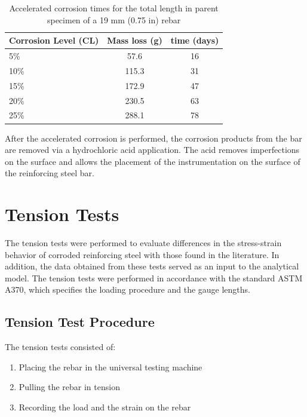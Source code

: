 \begin{table}[htbp]
	\caption{Accelerated corrosion times for the total length in parent specimen of a 19 mm (0.75 in) rebar}
	\label{tab:AcceleratedCorrosionTime}
	\centering	
		\begin{tabular}{l c c}
		Corrosion Level (CL) & Mass loss (g)   & time (days)     \\  \hline	
		5\%                  & 57.6            & 16    \\	
		10\%                 & 115.3            & 31     \\	
		15\%                 & 172.9            & 47   \\	
		20\%                 & 230.5            & 63     \\
		25\%                 & 288.1               & 78   \\
		\end{tabular}
\end{table}

After the accelerated corrosion is performed, the corrosion products from the bar are removed via a hydrochloric acid application. The acid removes imperfections on the surface and allows the placement of the instrumentation on the surface of the reinforcing steel bar.

\section{Tension Tests}

The tension tests were performed to evaluate differences in the stress-strain behavior of corroded reinforcing steel with those found in the literature. In addition, the data obtained from these tests served as an input to the analytical model. The tension tests were performed in accordance with the standard ASTM A370, which specifies the loading procedure and the gauge lengths. 
\subsection{Tension Test Procedure}

The tension tests consisted of:
\begin{enumerate}
    \item Placing the rebar in the universal testing machine
    \item Pulling the rebar in tension 
    \item Recording the load and the strain on the rebar 
\end{enumerate}

